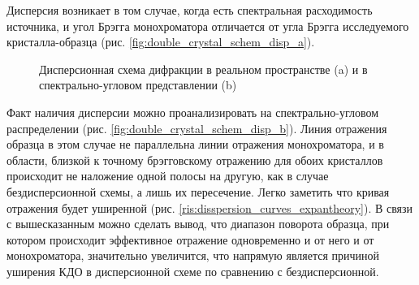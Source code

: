 \label{sec:dispersion_cal_an_exp}
  Дисперсия возникает в том случае, когда есть спектральная расходимость источника, и
   угол Брэгга монохроматора отличается от угла Брэгга исследуемого кристалла-образца
   (рис. \ref{fig:double_crystal_schem_disp_a}).
  \begin{figure}[H]
    \centering
    \hfill
    \caption{Дисперсионная схема дифракции в реальном пространстве (a) и в спектрально-угловом представлении (b)}
    \label{ris:double_crystal_schem_disp}
  \end{figure}
  Факт наличия дисперсии можно проанализировать на спектрально-угловом распределении
  (рис. \ref{fig:double_crystal_schem_disp_b}). Линия отражения образца в этом случае
  не параллельна линии отражения монохроматора, и в области, близкой к точному брэгговскому
  отражению для обоих кристаллов происходит не наложение одной полосы на другую,
  как в случае бездисперсионной схемы,
  а лишь их пересечение. Легко заметить что кривая отражения будет уширенной (рис. \ref{ris:disspersion_curves_expantheory}).
  В связи с вышесказанным можно сделать вывод, что диапазон поворота образца,
   при котором происходит эффективное отражение одновременно и от него и от монохроматора,
   значительно увеличится, что напрямую является причиной уширения КДО в дисперсионной схеме по сравнению
   с бездисперсионной.

